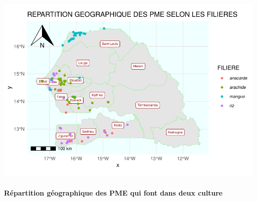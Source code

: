 \documentclass[
]{article}
\begin{document}
\begin{center}\includegraphics{Projet_R_ISE_1_files/figure-latex/unnamed-chunk-38-1} \end{center}

\hfill\break

\hypertarget{ruxe9partition-guxe9ographique-des-pme-qui-font-dans-deux-culture}{%
\paragraph{Répartition géographique des PME qui font dans deux
culture}\label{ruxe9partition-guxe9ographique-des-pme-qui-font-dans-deux-culture}}

\hfill\break
\end{document}
